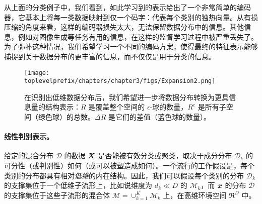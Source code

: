 \documentclass[../../book-main_zh.tex]{subfiles}
\begin{document}
从上面的分类例子中，我们看到，如此学习到的表示给出了一个非常简单的编码器，它基本上将每一类数据映射到仅一个码字：代表每个类别的独热向量。从有损压缩的角度来看，这样的编码器损失太大，无法保留数据分布中的信息。其他信息，例如对图像生成等任务有用的信息，在这样的监督学习过程中被严重丢失了。为了弥补这种情况，我们希望学习一个不同的编码方案，使得最终的特征表示能够捕捉到关于数据分布的更丰富的信息，而不仅仅是用于分类的信息。



\begin{figure}[ht]
	\centering
	\texttt{[image: \\toplevelprefix/chapters/chapter3/figs/Expansion2.png]}
	\caption{在识别出低维数据分布后，我们希望进一步将数据分布转换为更具信息量的结构表示：$R$ 是覆盖整个空间的 $\epsilon$-球的数量，$R^c$ 是所有子空间（绿色球）的总数。$\Delta R$ 是它们的差值（蓝色球的数量）。}\label{fig:sphere-packing}
	\label{fig:informative-representation}
\end{figure}


\paragraph{线性判别表示。}
给定的混合分布 $\mathcal{D}$ 的数据 $\bm{X}$ 是否能被有效分类或聚类，取决于成分分布 $\mathcal{D}_k$ 的可分性（或判别性）如何（或可以被塑造成如何）。一个流行的工作假设是，每个类别的分布都具有相对{\em 低维}的内在结构。因此，我们可以假设每个类别的分布 $\mathcal{D}_k$ 的支撑集位于一个低维子流形上，比如说维度为 $d_k \ll D$ 的 $\mathcal{M}_k$，而 $\bm{x}$ 的分布 $\mathcal D$ 的支撑集位于这些子流形的混合体 $\mathcal M = \cup_{k=1}^K \mathcal{M}_k$ 上，在高维环境空间 $\Re^D$ 中。
\end{document}
